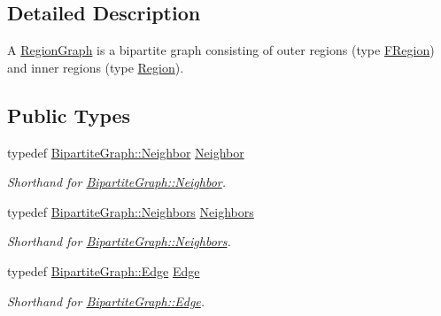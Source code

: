 \subsection{Detailed Description}
A \hyperlink{classdai_1_1RegionGraph}{RegionGraph} is a bipartite graph consisting of outer regions (type \hyperlink{classdai_1_1FRegion}{FRegion}) and inner regions (type \hyperlink{classdai_1_1Region}{Region}). \subsection*{Public Types}
\begin{CompactItemize}
\item 
\hypertarget{classdai_1_1FactorGraph_1552870151bb7f7a88b3120a777c1056}{
typedef \hyperlink{structdai_1_1BipartiteGraph_1_1Neighbor}{BipartiteGraph::Neighbor} \hyperlink{classdai_1_1FactorGraph_1552870151bb7f7a88b3120a777c1056}{Neighbor}}
\label{classdai_1_1FactorGraph_1552870151bb7f7a88b3120a777c1056}

\begin{CompactList}\small\item\em Shorthand for \hyperlink{structdai_1_1BipartiteGraph_1_1Neighbor}{BipartiteGraph::Neighbor}. \item\end{CompactList}\item 
\hypertarget{classdai_1_1FactorGraph_326942db90fe2dbdf99041d5d966019e}{
typedef \hyperlink{classdai_1_1BipartiteGraph_031237b607d2868b80052e71b4149b29}{BipartiteGraph::Neighbors} \hyperlink{classdai_1_1FactorGraph_326942db90fe2dbdf99041d5d966019e}{Neighbors}}
\label{classdai_1_1FactorGraph_326942db90fe2dbdf99041d5d966019e}

\begin{CompactList}\small\item\em Shorthand for \hyperlink{classdai_1_1BipartiteGraph_031237b607d2868b80052e71b4149b29}{BipartiteGraph::Neighbors}. \item\end{CompactList}\item 
\hypertarget{classdai_1_1FactorGraph_743243688f787418eff5352140980119}{
typedef \hyperlink{classdai_1_1BipartiteGraph_ff511d0eba0fd2956c08b602029ba95f}{BipartiteGraph::Edge} \hyperlink{classdai_1_1FactorGraph_743243688f787418eff5352140980119}{Edge}}
\label{classdai_1_1FactorGraph_743243688f787418eff5352140980119}

\begin{CompactList}\small\item\em Shorthand for \hyperlink{classdai_1_1BipartiteGraph_ff511d0eba0fd2956c08b602029ba95f}{BipartiteGraph::Edge}. \item\end{CompactList}\end{CompactItemize}
